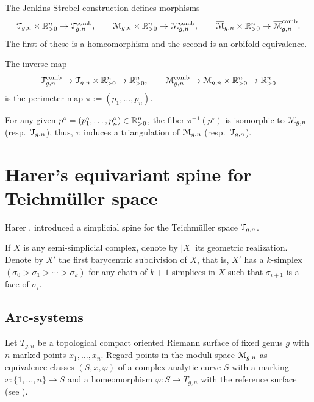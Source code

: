 \begin{theorem} 
  The Jenkins-Strebel construction defines morphisms
  \begin{equation*}
    \mathcal{T}_{g,n} \times \mathbb{R}_{>0}^n \to \mathcal{T}\sp{\text{comb}}_{g,n}, 
    \qquad
    \mathcal{M}_{g,n} \times \mathbb{R}_{>0}^n \to \mathcal{M}\sp{\text{comb}}_{g,n}, 
    \qquad 
    \overline{\mathcal{M}}_{g,n} \times \mathbb{R}_{>0}^n \to \overline{\mathcal{M}}\sp{\text{comb}}_{g,n}.
  \end{equation*}
  The first of these is a homeomorphism and the second is an orbifold
  equivalence. 

  The inverse map
  \begin{equation*}
    \mathcal{T}\sp{\text{comb}}_{g,n} \to \mathcal{T}_{g,n} \times \mathbb{R}_{>0}^n \to \mathbb{R}_{>0}^n,
    \qquad
    \mathcal{M}\sp{\text{comb}}_{g,n} \to \mathcal{M}_{g,n} \times \mathbb{R}_{>0}^n \to \mathbb{R}_{>0}^n
  \end{equation*}
  is the perimeter map $\pi := (p_1, \ldots, p_n)$.  
\end{theorem}

For any given $p^\circ = (p_1^\circ, \ldots, p_n^\circ) \in \mathbb{R}_{>0}^n$, the fiber
$\pi^{-1}(p^\circ)$ is isomorphic to $\mathcal{M}_{g,n}$ (resp.\ $\mathcal{T}_{g,n}$), thus,
$\pi$ induces a triangulation of $\mathcal{M}_{g,n}$ (resp.\ $\mathcal{T}_{g,n}$).



\section{Harer's equivariant spine for Teichm\"uller space}
\label{sec:spine}

Harer \cite{harer;cohomological-dimension}, introduced a simplicial
spine for the Teichm\"uller space $\mathcal{T}_{g,n}$.  

If $X$ is any semi-simplicial complex, denote by $|X|$ its geometric
realization.  Denote by $X'$ the first barycentric subdivision of $X$,
that is, $X'$ has a $k$-simplex $(\sigma_0 > \sigma_1 > \cdots > \sigma_k)$ for any chain
of $k+1$ simplices in $X$ such that $\sigma_{i+1}$ is a face of $\sigma_i$.


\subsection{Arc-systems}
\label{sec:arc-systems}

Let $T_{g,n}$ be a topological compact oriented Riemann surface of
fixed genus $g$ with $n$ marked points $x_1, \ldots, x_n$.  Regard points
in the moduli space $\mathcal{M}_{g,n}$ as equivalence classes $(S,x,\varphi)$ of a
complex analytic curve $S$ with a marking $x:\{1,\ldots,n\}\to S$ and a
homeomorphism $\varphi:S\to T_{g,n}$ with the reference surface (see
).

